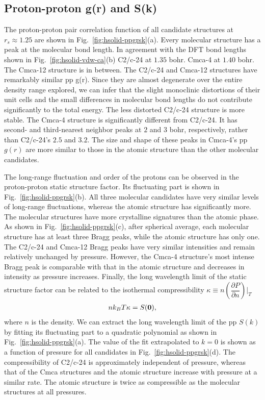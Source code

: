 \subsection{Proton-proton g(r) and S(k)}

The proton-proton pair correlation function of all candidate structures at $r_s\approx1.25$ are shown in Fig.~\ref{fig:hsolid-ppgrsk}(a).
Every molecular structure has a peak at the molecular bond length.
In agreement with the DFT bond lengths shown in Fig.~\ref{fig:hsolid-vdw-ca}(b)
C2/c-24 at $1.35$ bohr. Cmca-4 at $1.40$ bohr. The Cmca-12 structure is in between.
The C2/c-24 and Cmca-12 structures have remarkably similar pp g(r).
Since they are almost degenerate over the entire density range explored, we can infer that the slight monoclinic distortions of their unit cells and the small differences in molecular bond lengths do not contribute significantly to the total energy. The less distorted C2/c-24 structure is more stable.
The Cmca-4 structure is significantly different from C2/c-24. It has second- and third-nearest neighbor peaks at $2$ and $3$ bohr, respectively, rather than C2/c-24's $2.5$ and $3.2$. The size and shape of these peaks in Cmca-4's pp $g(r)$ are more similar to those in the atomic structure than the other molecular candidates.

The long-range fluctuation and order of the protons can be observed in the proton-proton static structure factor. Its fluctuating part is shown in Fig.~\ref{fig:hsolid-ppgrsk}(b).
All three molecular candidates have very similar levels of long-range fluctuations, whereas the atomic structure has significantly more.
The molecular structures have more crystalline signatures than the atomic phase.
As shown in Fig.~\ref{fig:hsolid-ppgrsk}(c), after spherical average, each molecular structure has at least three Bragg peaks, while the atomic structure has only one.
The C2/c-24 and Cmca-12 Bragg peaks have very similar intensities and remain relatively unchanged by pressure.
However, the Cmca-4 structure's most intense Bragg peak is comparable with that in the atomic structure and decreases in intensity as pressure increases.
Finally, the long wavelength limit of the static structure factor can be related to the isothermal compressibility $\kappa\equiv n(\dfrac{\partial P}{\partial n})\vert_T$
\begin{align}
nk_BT\kappa = S(\boldsymbol{0}),
\end{align}
where $n$ is the density. We can extract the long wavelength limit of the pp $S(k)$ by fitting its fluctuating part to a quadratic polynomial as shown in Fig.~\ref{fig:hsolid-ppgrsk}(a).
The value of the fit extrapolated to $k=0$ is shown as a function of pressure for all candidates in Fig.~\ref{fig:hsolid-ppgrsk}(d).
The compressibility of C2/c-24 is approximately independent of pressure, whereas that of the Cmca structures and the atomic structure increase with pressure at a similar rate.
The atomic structure is twice as compressible as the molecular structures at all pressures.

